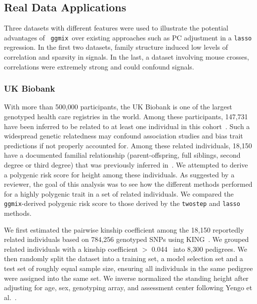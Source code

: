\documentclass[10pt,letterpaper]{article}
\newcommand{\ggmix}{\texttt{ggmix}}
\begin{document}
\subsection*{Real Data Applications}

Three datasets with different features were used to illustrate the potential advantages of ~\ggmix ~over existing approaches such as PC adjustment in a \texttt{lasso} regression. In the first two datasets, family structure induced low levels of correlation and sparsity in signals. In the last, a dataset involving mouse crosses, correlations were extremely strong and could confound signals.

\subsubsection*{UK Biobank} \label{subsubsec:UKB}

With more than 500,000 participants, the UK Biobank is one of the largest genotyped health care registries in the world. Among these participants, 147,731 have been inferred to be related to at least one individual in this cohort~\cite{bycroft2018uk}. Such a widespread genetic relatedness may confound association studies and bias trait predictions if not properly accounted for. Among these related individuals, 18,150 have a documented familial relationship (parent-offspring, full siblings, second degree or third degree) that was previously inferred in~\cite{biobank2015genotyping}. We attempted to derive a polygenic risk score for height among these individuals. As suggested by a reviewer, the goal of this analysis was to see how the different methods performed for a highly polygenic trait in a set of related individuals. We compared the \ggmix-derived polygenic risk score to those derived by the \texttt{twostep} and \texttt{lasso} methods.

We first estimated the pairwise kinship coefficient among the 18,150 reportedly related individuals based on 784,256 genotyped SNPs using KING~\cite{manichaikul2010robust}. We grouped related individuals with a kinship coefficient $>$ 0.044~\cite{manichaikul2010robust} into 8,300 pedigrees. We then randomly split the dataset into a training set, a model selection set and a test set of roughly equal sample size, ensuring all individuals in the same pedigree were assigned into the same set. We inverse normalized the standing height after adjusting for age, sex, genotyping array, and assessment center following Yengo et al.~\cite{yengo2018meta}. 
\end{document}
